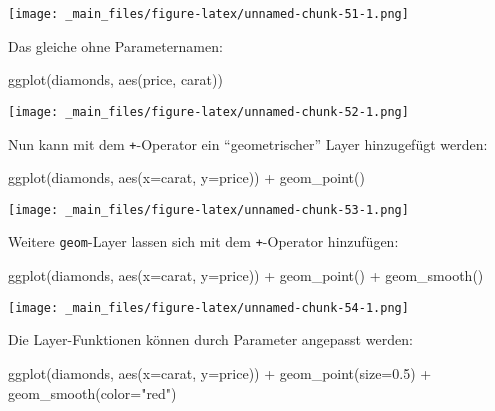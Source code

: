 \documentclass[11pt,german,a4paper]{article}
\newenvironment{Shaded}{\begin{snugshade}}{\end{snugshade}}
\newcommand{\AttributeTok}[1]{\textcolor[rgb]{0.77,0.63,0.00}{#1}}
\newcommand{\FloatTok}[1]{\textcolor[rgb]{0.00,0.00,0.81}{#1}}
\newcommand{\FunctionTok}[1]{\textcolor[rgb]{0.00,0.00,0.00}{#1}}
\newcommand{\NormalTok}[1]{#1}
\newcommand{\SpecialCharTok}[1]{\textcolor[rgb]{0.00,0.00,0.00}{#1}}
\newcommand{\StringTok}[1]{\textcolor[rgb]{0.31,0.60,0.02}{#1}}
\begin{document}
\texttt{[image: \_main\_files/figure-latex/unnamed-chunk-51-1.png]}

Das gleiche ohne Parameternamen:

\begin{Shaded}
\begin{Highlighting}[]
\FunctionTok{ggplot}\NormalTok{(diamonds, }\FunctionTok{aes}\NormalTok{(price, carat))}
\end{Highlighting}
\end{Shaded}

\texttt{[image: \_main\_files/figure-latex/unnamed-chunk-52-1.png]}

Nun kann mit dem \texttt{+}-Operator ein ``geometrischer'' Layer hinzugefügt werden:

\begin{Shaded}
\begin{Highlighting}[]
\FunctionTok{ggplot}\NormalTok{(diamonds, }\FunctionTok{aes}\NormalTok{(}\AttributeTok{x=}\NormalTok{carat, }\AttributeTok{y=}\NormalTok{price)) }\SpecialCharTok{+}
  \FunctionTok{geom\_point}\NormalTok{()}
\end{Highlighting}
\end{Shaded}

\texttt{[image: \_main\_files/figure-latex/unnamed-chunk-53-1.png]}

Weitere \texttt{geom}-Layer lassen sich mit dem \texttt{+}-Operator hinzufügen:

\begin{Shaded}
\begin{Highlighting}[]
\FunctionTok{ggplot}\NormalTok{(diamonds, }\FunctionTok{aes}\NormalTok{(}\AttributeTok{x=}\NormalTok{carat, }\AttributeTok{y=}\NormalTok{price)) }\SpecialCharTok{+}
  \FunctionTok{geom\_point}\NormalTok{() }\SpecialCharTok{+}
  \FunctionTok{geom\_smooth}\NormalTok{()}
\end{Highlighting}
\end{Shaded}

\texttt{[image: \_main\_files/figure-latex/unnamed-chunk-54-1.png]}

Die Layer-Funktionen können durch Parameter angepasst werden:

\begin{Shaded}
\begin{Highlighting}[]
\FunctionTok{ggplot}\NormalTok{(diamonds, }\FunctionTok{aes}\NormalTok{(}\AttributeTok{x=}\NormalTok{carat, }\AttributeTok{y=}\NormalTok{price)) }\SpecialCharTok{+}
  \FunctionTok{geom\_point}\NormalTok{(}\AttributeTok{size=}\FloatTok{0.5}\NormalTok{) }\SpecialCharTok{+}
  \FunctionTok{geom\_smooth}\NormalTok{(}\AttributeTok{color=}\StringTok{"red"}\NormalTok{)}
\end{Highlighting}
\end{Shaded}
\end{document}

